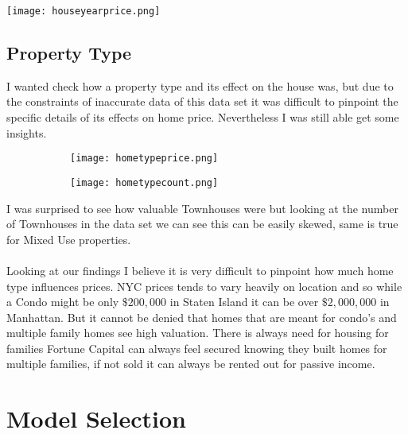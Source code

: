 \documentclass{article}
\begin{document}
\begin{titlepage}
\begin{center}
        \texttt{[image: houseyearprice.png]}
\end{center}

\subsection{Property Type}
I wanted check how a property type and its effect on the house was, but due to the constraints of inaccurate data of this data set it was difficult to pinpoint the specific details of its effects on home price. Nevertheless I  was still able get some insights.
\begin{figure}[H]
\begin{subfigure}{.5\textwidth}
\texttt{[image: hometypeprice.png]}
\end{subfigure}
\begin{subfigure}{.5\textwidth}
\texttt{[image: hometypecount.png]}
\end{subfigure}
\end{figure}

\clearpage
I was surprised to see how valuable Townhouses were but looking at the number of Townhouses in the data set we can see this can be easily skewed, same is true for Mixed Use properties.\\
\\
Looking at our findings I believe it is very difficult to pinpoint how much home type influences prices. NYC prices tends to vary heavily on location and so while a Condo might be only $\$200,000$ in Staten Island it can be over $\$2,000,000$ in Manhattan. But it cannot be denied that homes that are meant for condo's and multiple family homes see high valuation. There is always need for housing for families Fortune Capital can always feel secured knowing they built homes for multiple families, if not sold it can always be rented out for passive income.

\section{Model Selection}

\end{titlepage}
\end{document}
